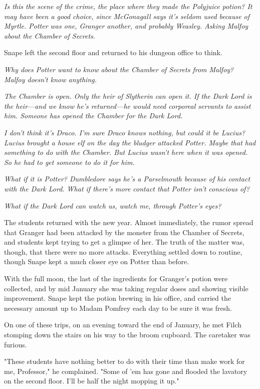\emph{Is this the scene of the crime, the place where they made the Polyjuice potion? It may have been a good choice, since McGonagall says it's seldom used because of Myrtle. Potter was one, Granger another, and probably Weasley. Asking Malfoy about the Chamber of Secrets.}

Snape left the second floor and returned to his dungeon office to think.

\emph{Why does Potter want to know about the Chamber of Secrets from Malfoy? Malfoy doesn't know anything.}

\emph{The Chamber is open. Only the heir of Slytherin can open it. If the Dark Lord is the heir—and we know he's returned—he would need corporeal servants to assist him. Someone has opened the Chamber for the Dark Lord.}

\emph{I don't think it's Draco. I'm sure Draco knows nothing, but could it be Lucius? Lucius brought a house elf on the day the bludger attacked Potter. Maybe that had something to do with the Chamber. But Lucius wasn't here when it was opened. So he had to get someone to do it for him.}

\emph{What if it is Potter? Dumbledore says he's a Parselmouth because of his contact with the Dark Lord. What if there's more contact that Potter isn't conscious of?}

\emph{What if the Dark Lord can watch us, watch me, through Potter's eyes?}

\sbreak

The students returned with the new year. Almost immediately, the rumor spread that Granger had been attacked by the monster from the Chamber of Secrets, and students kept trying to get a glimpse of her. The truth of the matter was, though, that there were no more attacks. Everything settled down to routine, though Snape kept a much closer eye on Potter than before.

With the full moon, the last of the ingredients for Granger's potion were collected, and by mid January she was taking regular doses and showing visible improvement. Snape kept the potion brewing in his office, and carried the necessary amount up to Madam Pomfrey each day to be sure it was fresh.

On one of these trips, on an evening toward the end of January, he met Filch stomping down the stairs on his way to the broom cupboard. The caretaker was furious.

"These students have nothing better to do with their time than make work for me, Professor," he complained. "Some of 'em has gone and flooded the lavatory on the second floor. I'll be half the night mopping it up."

